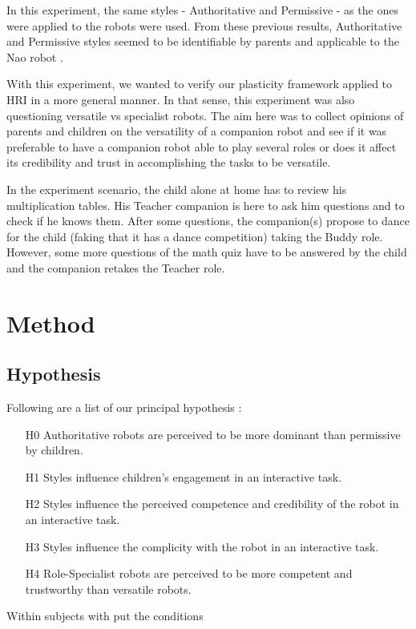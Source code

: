 \documentclass[smallextended]{svjour3}
\begin{document}
In this experiment, the same styles - Authoritative and Permissive -  as the ones were applied to the robots were used.
From these previous results, Authoritative and Permissive styles seemed to be identifiable by parents and applicable to the Nao robot \cite{Johal2014}. 

With this experiment, we wanted to verify our plasticity framework applied to HRI in a more general manner. 
In that sense, this experiment was also questioning versatile vs specialist robots. 
The aim here was to collect opinions of parents and children on the versatility of a companion robot and see if it was preferable to have a companion robot able to play several roles or does it affect its credibility and trust in accomplishing the tasks to be versatile.

In the experiment scenario, the child alone at home has to review his multiplication tables. 
His Teacher companion is here to ask him questions and to check if he knows them. 
After some questions, the companion(s) propose to dance for the child (faking that it has a dance competition) taking the Buddy role. 
However, some more questions of the math quiz have to be answered by the child and the companion retakes the Teacher role.


\section{Method}
\subsection{Hypothesis}
Following are a list of our principal hypothesis :
\begin{itemize}[noitemsep,nolistsep]
	\item[H0] Authoritative robots are perceived to be more dominant than permissive by children.
	\item[H1] Styles influence children's engagement in an interactive task.
	\item[H2] Styles influence the perceived competence and credibility of the robot in an interactive task.
	\item[H3] Styles influence the complicity with the robot in an interactive task.
	\item[H4] Role-Specialist robots are perceived to be more competent and trustworthy than versatile robots.
\end{itemize}
Within subjects with put the conditions
\end{document}
